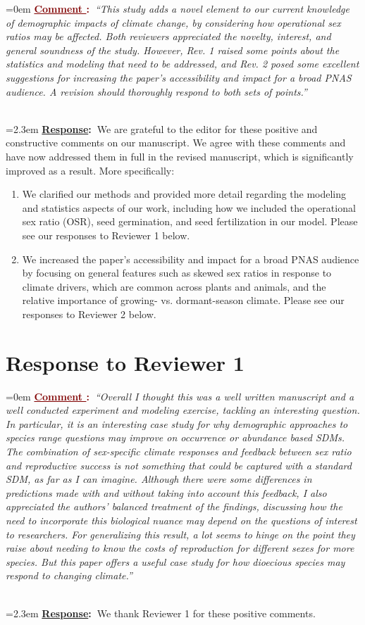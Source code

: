 \documentclass[12pt]{article}
\newcounter{cN}
\newcommand{\comment}[1]{
	\vspace{2em}
	\refstepcounter{cN} %
	\noindent \hangindent=0em \textbf{\textcolor{Maroon}{\uline{Comment \thecN}:~}}\emph{``#1''}
	}
\newcommand{\response}[1]{
	\\[0.25em]
	\hangindent=2.3em \textbf{\textcolor{NavyBlue}{\uline{Response}:~}}#1
	}
\begin{document}
\comment{This study adds a novel element to our current knowledge of demographic impacts of climate change, by considering how operational sex ratios may be affected. Both reviewers appreciated the novelty, interest, and general soundness of the study. However, Rev. 1 raised some points about the statistics and modeling that need to be addressed, and Rev. 2 posed some excellent suggestions for increasing the paper's accessibility and impact for a broad PNAS audience. A revision should thoroughly respond to both sets of points.}
\response{We are grateful to  the editor for these  positive and constructive comments on our manuscript. 
We agree with these comments and have now addressed them in full in the revised manuscript, which is significantly improved as a result. 
More   specifically:
\begin{enumerate}
	\item We clarified our methods and provided more detail regarding the modeling and statistics aspects of our work, including how we included the operational sex ratio (OSR), seed germination, and seed fertilization in our model. Please see our responses to Reviewer 1 below.
	\item We increased the paper’s accessibility and impact for a broad PNAS audience by focusing on general features such as skewed sex ratios in response to climate drivers, which are common across plants and animals, and the relative importance of growing- vs. dormant-season climate. Please see our responses to Reviewer 2 below.
\end{enumerate}
}

\section{Response to Reviewer 1}
\vspace{-2em}

\comment{Overall I thought this was a well written manuscript and a well conducted experiment and modeling exercise, tackling an interesting question. In particular, it is an interesting case study for why demographic approaches to species range questions may improve on occurrence or abundance based SDMs. The combination of sex-specific climate responses and feedback between sex ratio and reproductive success is not something that could be captured with a standard SDM, as far as I can imagine. Although there were some differences in predictions made with and without taking into account this feedback, I also appreciated the authors’ balanced treatment of the findings, discussing how the need to incorporate this biological nuance may depend on the questions of interest to researchers. For generalizing this result, a lot seems to hinge on the point they raise about needing to know the costs of reproduction for different sexes for more species. But this paper offers a useful case study for how dioecious species may respond to changing climate.}
\response{We thank Reviewer 1 for these positive comments.}
\end{document}
